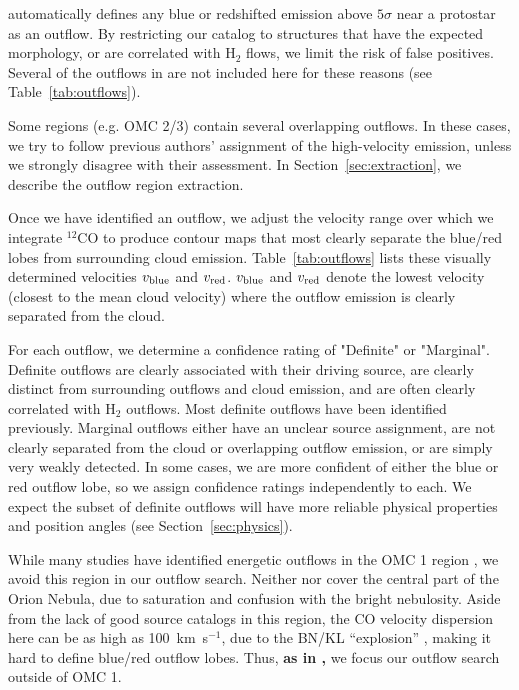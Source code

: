 \documentclass[twocolumn]{aastex63}
\newcommand{\co}[1][]{\ensuremath{^{#1}}CO}
\begin{document}
\citet{Tanabe19} automatically defines any blue or redshifted emission above $5\sigma$ near a protostar as an outflow. By restricting our catalog to structures that have the expected morphology, or are correlated with H$_2$ flows, we limit the risk of false positives. Several of the outflows in \citet{Tanabe19} are not included here for these reasons (see Table~\ref{tab:outflows}).

Some regions (e.g. OMC 2/3) contain several overlapping outflows. In these cases, we try to follow previous authors' assignment of the high-velocity emission, unless we strongly disagree with their assessment. In Section~\ref{sec:extraction}, we describe the outflow region extraction.

Once we have identified an outflow, we adjust the velocity range over which we integrate \co[12]{} to produce contour maps that most clearly separate the blue/red lobes from surrounding cloud emission. Table~\ref{tab:outflows} lists these visually determined velocities $v_{\rm blue}$ and $v_{\rm red}$. $v_{\rm blue}$ and $v_{\rm red}$ denote the lowest velocity (closest to the mean cloud velocity) where the outflow emission is clearly separated from the cloud. 

For each outflow, we determine a confidence rating of "Definite" or "Marginal". Definite outflows are clearly associated with their driving source, are clearly distinct from surrounding outflows and cloud emission, and are often clearly correlated with H$_2$ outflows. Most definite outflows have been identified previously. Marginal outflows either have an unclear source assignment, are not clearly separated from the cloud or overlapping outflow emission, or are simply very weakly detected. In some cases, we are more confident of either the blue or red outflow lobe, so we assign confidence ratings independently to each. We expect the subset of definite outflows will have more reliable physical properties and position angles (see Section~\ref{sec:physics}).

While many studies have identified energetic outflows in the OMC 1 region \citep[e.g.][]{Schmid-Burgk90,Zapata05,Teixeira16,Bally17}, we avoid this region in our outflow search. Neither \citet{Davis09} nor \citet{Furlan16} cover the central part of the Orion Nebula, due to saturation and confusion with the bright nebulosity. Aside from the lack of good source catalogs in this region, the CO velocity dispersion here can be as high as 100~km~s$^{-1}$, due to the BN/KL ``explosion'' \citep{Bally17}, making it hard to define blue/red outflow lobes. Thus, \textbf{as in \citet{Tanabe19},} we focus our outflow search outside of OMC 1. 
\end{document}
